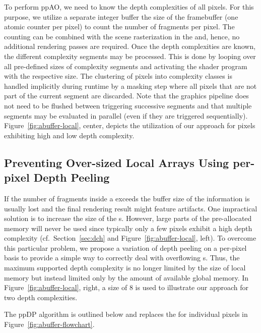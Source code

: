 \documentclass{egpubl}
\newcommand{\stencil}{ppAO}
\newcommand{\dloop}{ppDP}
\begin{document}
To perform \stencil, we need to know the depth complexities of all pixels. 
For this purpose, we utilize a separate integer buffer the size of the framebuffer (one atomic counter per pixel) to count the number of fragments per pixel.
The counting can be combined with the scene rasterization in the \sFill{} and, hence, no additional rendering passes are required.
%
Once the depth complexities are known, the different complexity segments may be processed. 
This is done by looping over all pre-defined sizes of complexity segments and activating the shader program with the respective \bArray{} size. 
The clustering of pixels into complexity classes is handled implicitly during runtime by a masking step where all pixels that are not part of the current segment are discarded. 
Note that the graphics pipeline does not need to be flushed between triggering successive segments and that multiple segments may be evaluated in parallel (even if they are triggered sequentially). 
Figure~\ref{fig:abuffer-local}, center, depicts the utilization of our approach for pixels exhibiting high and low depth complexity.

\subsection{Preventing Over-sized Local Arrays Using per-pixel Depth Peeling}
\label{sec:ppdp}

If the number of fragments inside a \bFraglist{} exceeds the buffer size of the \bArray{} information is usually lost and the final rendering result might feature artifacts.
One impractical solution is to increase the size of the \bArray{}s.
However, large parts of the pre-allocated memory will never be used since typically only a few pixels exhibit a high depth complexity (cf.~Section~\ref{sec:dch} and Figure~\ref{fig:abuffer-local}, left).
To overcome this particular problem, we propose a variation of depth peeling on a per-pixel basis to provide a simple way to correctly deal with overflowing \bArray{}s.
Thus, the maximum supported depth complexity is no longer limited by the size of local memory but instead limited only by the amount of available global memory.
In Figure~\ref{fig:abuffer-local}, right, a \bArray{} size of 8 is used to illustrate our approach for two depth complexities.

The \dloop{} algorithm is outlined below and replaces the \sResolve{} for individual pixels in Figure~\ref{fig:abuffer-flowchart}.
\end{document}
